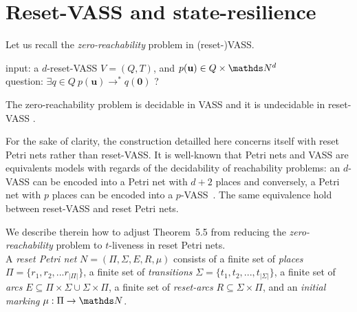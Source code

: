 

\section{Reset-VASS and state-resilience}\label{appendix}






Let us recall the {\em zero-reachability} problem in (reset-)VASS.

\noindent
input: a $d$-reset-VASS $V=(Q,T)$, and $p(\textbf{u}) \in Q \times \N^d$ \\
question:  $\exists q \in Q ~ p(\textbf{u}) \to^* q(\textbf{0})$ ?

The zero-reachability problem is decidable in VASS and it is undecidable in reset-VASS \cite{araki1976PN}.

For the sake of clarity, the construction detailled here concerns itself with reset Petri nets rather than reset-VASS. It is well-known that Petri nets and VASS are equivalents models with regards of the decidability of reachability problems: an $d$-VASS can be encoded into a Petri net with $d+2$ places and conversely, a Petri net with $p$ places can be encoded into a $p$-VASS~\cite{DBLP:journals/siglog/Schmitz16}. The same equivalence hold between reset-VASS and reset Petri nets.

We describe therein how to adjust Theorem~5.5 from \cite{peterson1981petri} reducing the {\em zero-reachability} problem to {\sc $t$-liveness} in reset Petri nets. \\


A \emph{reset Petri net} $N = (\Pi, \Sigma, E, R, \mu)$ consists of a finite set of {\em places} $\Pi = \{r_1, r_2, ... r_{|\Pi|}\}$, a finite set of {\em transitions} $\Sigma = \{t_1, t_2, ..., t_{|\Sigma|} \}$, a finite set of {\em arcs} $E \subseteq \Pi \times \Sigma \cup \Sigma \times \Pi$, a finite set of
{\em reset-arcs} $R \subseteq \Sigma \times \Pi$, and an {\em initial marking} $\mu : \Pi \to \N$.


